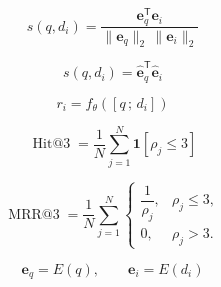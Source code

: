 \documentclass{article}
\begin{document}
\[
s(q,d_i)=\frac{\mathbf{e}_q^{\mathsf T}\mathbf{e}_i}{\lVert\mathbf{e}_q\rVert_2\,\lVert\mathbf{e}_i\rVert_2}
\]

\[
s(q,d_i)=\widehat{\mathbf e}_q^{\mathsf T}\widehat{\mathbf e}_i
\]

\[
r_i=f_{\theta}\!\left([q\,;\,d_i]\right)
\]

\[
\operatorname{Hit@3}=\frac{1}{N}\sum_{j=1}^{N}\mathbf{1}\!\left[\rho_j\leq3\right]
\]

\[
\operatorname{MRR@3}=\frac{1}{N}\sum_{j=1}^{N}\begin{cases}\dfrac{1}{\rho_j},&\rho_j\leq3,\\[3pt]0,&\rho_j>3.\end{cases}
\]

\[
\mathbf e_q=E(q),\qquad \mathbf e_i=E(d_i)
\]
\end{document}
